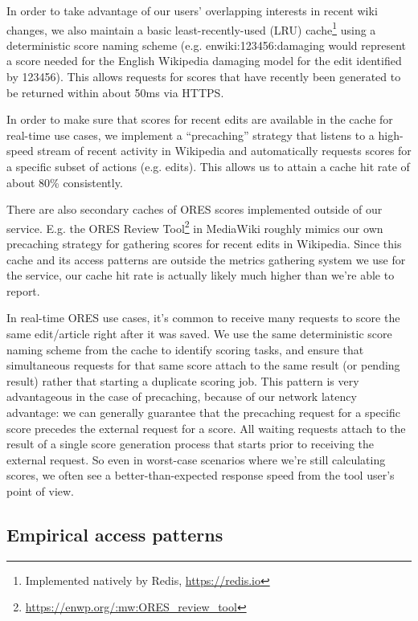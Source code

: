 In order to take advantage of our users' overlapping interests in recent wiki changes, we also maintain a basic least-recently-used (LRU) cache\footnote{Implemented natively by Redis, \url{https://redis.io}} using a deterministic score naming scheme (e.g. enwiki:123456:damaging would represent a score needed for the English Wikipedia damaging model for the edit identified by 123456).  This allows requests for scores that have recently been generated to be returned within about 50ms via HTTPS.

In order to make sure that scores for recent edits are available in the cache for real-time use cases, we implement a ``precaching'' strategy that listens to a high-speed stream of recent activity in Wikipedia and automatically requests scores for a specific subset of actions (e.g. edits).  This allows us to attain a cache hit rate of about 80\% consistently.

There are also secondary caches of ORES scores implemented outside of our service.  E.g. the ORES Review Tool\footnote{\url{https://enwp.org/:mw:ORES_review_tool}} in MediaWiki roughly mimics our own precaching strategy for gathering scores for recent edits in Wikipedia.  Since this cache and its access patterns are outside the metrics gathering system we use for the service, our cache hit rate is actually likely much higher than we're able to report.

In real-time ORES use cases, it's common to receive many requests to score the same edit/article right after it was saved.  We use the same deterministic score naming scheme from the cache to identify scoring tasks, and ensure that simultaneous requests for that same score attach to the same result (or pending result) rather that starting a duplicate scoring job.  This pattern is very advantageous in the case of precaching, because of our network latency advantage: we can generally guarantee that the precaching request for a specific score precedes the external request for a score.  All waiting requests attach to the result of a single score generation process that starts prior to receiving the external request.  So even in worst-case scenarios where we're still calculating scores, we often see a better-than-expected response speed from the tool user's point of view.

\subsection{Empirical access patterns}


